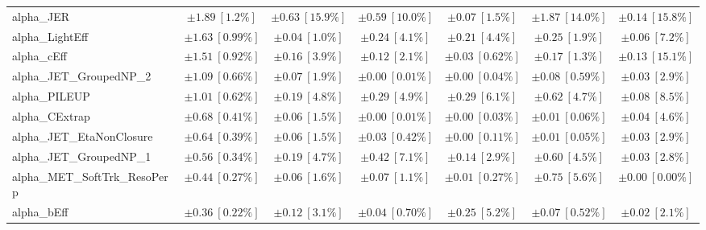 \begin{sidewaystable}
\begin{center}
\begin{tabular*}{\textwidth}{@{\extracolsep{\fill}}lcccccc}
alpha\_JER         & $\pm 1.89\ [1.2\%] $          & $\pm 0.63\ [15.9\%] $          & $\pm 0.59\ [10.0\%] $          & $\pm 0.07\ [1.5\%] $          & $\pm 1.87\ [14.0\%] $          & $\pm 0.14\ [15.8\%] $       \\
alpha\_LightEff         & $\pm 1.63\ [0.99\%] $          & $\pm 0.04\ [1.0\%] $          & $\pm 0.24\ [4.1\%] $          & $\pm 0.21\ [4.4\%] $          & $\pm 0.25\ [1.9\%] $          & $\pm 0.06\ [7.2\%] $       \\
alpha\_cEff         & $\pm 1.51\ [0.92\%] $          & $\pm 0.16\ [3.9\%] $          & $\pm 0.12\ [2.1\%] $          & $\pm 0.03\ [0.62\%] $          & $\pm 0.17\ [1.3\%] $          & $\pm 0.13\ [15.1\%] $       \\
alpha\_JET\_GroupedNP\_2         & $\pm 1.09\ [0.66\%] $          & $\pm 0.07\ [1.9\%] $          & $\pm 0.00\ [0.01\%] $          & $\pm 0.00\ [0.04\%] $          & $\pm 0.08\ [0.59\%] $          & $\pm 0.03\ [2.9\%] $       \\
alpha\_PILEUP         & $\pm 1.01\ [0.62\%] $          & $\pm 0.19\ [4.8\%] $          & $\pm 0.29\ [4.9\%] $          & $\pm 0.29\ [6.1\%] $          & $\pm 0.62\ [4.7\%] $          & $\pm 0.08\ [8.5\%] $       \\
alpha\_CExtrap         & $\pm 0.68\ [0.41\%] $          & $\pm 0.06\ [1.5\%] $          & $\pm 0.00\ [0.01\%] $          & $\pm 0.00\ [0.03\%] $          & $\pm 0.01\ [0.06\%] $          & $\pm 0.04\ [4.6\%] $       \\
alpha\_JET\_EtaNonClosure         & $\pm 0.64\ [0.39\%] $          & $\pm 0.06\ [1.5\%] $          & $\pm 0.03\ [0.42\%] $          & $\pm 0.00\ [0.11\%] $          & $\pm 0.01\ [0.05\%] $          & $\pm 0.03\ [2.9\%] $       \\
alpha\_JET\_GroupedNP\_1         & $\pm 0.56\ [0.34\%] $          & $\pm 0.19\ [4.7\%] $          & $\pm 0.42\ [7.1\%] $          & $\pm 0.14\ [2.9\%] $          & $\pm 0.60\ [4.5\%] $          & $\pm 0.03\ [2.8\%] $       \\
alpha\_MET\_SoftTrk\_ResoPerp         & $\pm 0.44\ [0.27\%] $          & $\pm 0.06\ [1.6\%] $          & $\pm 0.07\ [1.1\%] $          & $\pm 0.01\ [0.27\%] $          & $\pm 0.75\ [5.6\%] $          & $\pm 0.00\ [0.00\%] $       \\
alpha\_bEff         & $\pm 0.36\ [0.22\%] $          & $\pm 0.12\ [3.1\%] $          & $\pm 0.04\ [0.70\%] $          & $\pm 0.25\ [5.2\%] $          & $\pm 0.07\ [0.52\%] $          & $\pm 0.02\ [2.1\%] $       \\

\end{tabular*}
\end{center}
\end{sidewaystable}
